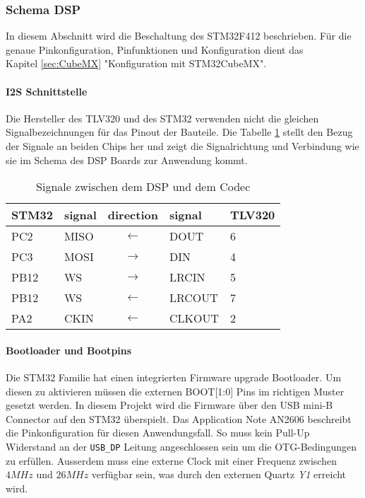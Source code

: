 \subsubsection{Schema DSP}
\label{sec:Schema_DSP}

In diesem Abschnitt wird die Beschaltung des STM32F412 beschrieben. Für die genaue Pinkonfiguration, Pinfunktionen und Konfiguration dient das \\
Kapitel \ref{sec:CubeMX} "Konfiguration mit STM32CubeMX".

\paragraph{I2S Schnittstelle}

Die Hersteller des TLV320 und des STM32 verwenden nicht die gleichen Signalbezeichnungen für das Pinout der Bauteile.
Die Tabelle \ref{tab:I2SPins} stellt den Bezug der Signale an beiden Chips her und zeigt die Signalrichtung und Verbindung wie sie im Schema des DSP Boards zur Anwendung kommt.

\begin{table}[H]
	\centering
	\begin{tabular}{|l|l|c|l|l|}
	\hline
	\textbf{STM32} & \textbf{signal} & \textbf{direction}         & \textbf{signal} & \textbf{TLV320} \\ \hline
	PC2            & MISO            & $\leftarrow$  & DOUT            & 6               \\ \hline
	PC3            & MOSI            & $\rightarrow$ & DIN             & 4               \\ \hline
	PB12           & WS              & $\rightarrow$ & LRCIN           & 5               \\ \hline
	PB12           & WS              & $\leftarrow$  & LRCOUT          & 7               \\ \hline
	PA2            & CKIN            & $\leftarrow$  & CLKOUT          & 2               \\ \hline
	\end{tabular}
	\caption{Signale zwischen dem DSP und dem Codec}
	\label{tab:I2SPins}
\end{table}


\paragraph{Bootloader und Bootpins}

Die STM32 Familie hat einen integrierten Firmware upgrade Bootloader.
Um diesen zu aktivieren müssen die externen BOOT[1:0] Pins im richtigen Muster gesetzt werden.
In diesem Projekt wird die Firmware über den USB mini-B Connector auf den STM32 überspielt.
Das Application Note AN2606 \cite[p.136]{AN2606} beschreibt die Pinkonfiguration für diesen Anwendungsfall.
So muss kein Pull-Up Widerstand an der \texttt{USB\_DP} Leitung angeschlossen sein um die OTG-Bedingungen zu erfüllen.
Ausserdem muss eine externe Clock mit einer Frequenz zwischen $4\si{MHz}$ und $26\si{MHz}$ verfügbar sein, was durch den externen Quartz \textit{Y1} erreicht wird.

